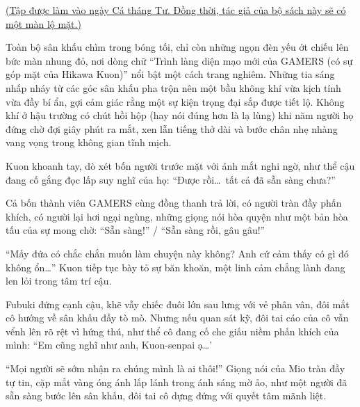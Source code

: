 \documentclass[../main.tex]{subfiles}
\begin{document}

\begin{center}
  \uline{(Tập được làm vào ngày Cá tháng Tư. Đồng thời, tác giả của bộ sách này sẽ có một màn lộ mặt.)}
\end{center}

Toàn bộ sân khấu chìm trong bóng tối, chỉ còn những ngọn đèn yếu ớt chiếu lên bức màn nhung đỏ, nơi dòng chữ ``Trình làng diện mạo mới của GAMERS (có sự góp mặt của Hikawa Kuon)'' nổi bật một cách trang nghiêm. Những tia sáng nhấp nháy từ các góc sân khấu pha trộn nên một bầu không khí vừa kịch tính vừa đầy bí ẩn, gợi cảm giác rằng một sự kiện trọng đại sắp được tiết lộ. Không khí ở hậu trường có chút hồi hộp (hay nói đúng hơn là lạ lùng) khi năm người họ đứng chờ đợi giây phút ra mắt, xen lẫn tiếng thở dài và bước chân nhẹ nhàng vang vọng trong không gian tĩnh mịch.


Kuon khoanh tay, dò xét bốn người trước mặt với ánh mắt nghi ngờ, như thể cậu đang cố gắng đọc lấp suy nghĩ của họ: ``Được rồi\dots\ tất cả đã sẵn sàng chưa?''

Cả bốn thành viên GAMERS cùng đồng thanh trả lời, có người tràn đầy phấn khích, có người lại hơi ngại ngùng, những giọng nói hòa quyện như một bản hòa tấu của sự mong chờ: ``Sẵn sàng!'' / ``Sẵn sàng rồi, gâu gâu!''

``Mấy đứa có chắc chắn muốn làm chuyện này không? Anh cứ cảm thấy có gì đó không ổn\dots'' Kuon tiếp tục bày tỏ sự băn khoăn, một linh cảm chẳng lành đang len lỏi trong tâm trí cậu.

Fubuki đứng cạnh cậu, khẽ vẫy chiếc đuôi lớn sau lưng với vẻ phân vân, đôi mắt cô hướng về sân khấu đầy tò mò. Nhưng nếu quan sát kỹ, đôi tai cáo của cô vẫn vểnh lên rõ rệt vì hứng thú, như thể cô đang cố che giấu niềm phấn khích của mình: ``Em cũng nghĩ như anh, Kuon-senpai ạ\dots'

``Mọi người sẽ sớm nhận ra chúng mình là ai thôi!'' Giọng nói của Mio tràn đầy tự tin, cặp mắt vàng óng ánh lấp lánh trong ánh sáng mờ ảo, như một người đã sẵn sàng bước lên sân khấu, đôi tai cô dựng đứng với quyết tâm mãnh liệt.
\end{document}
